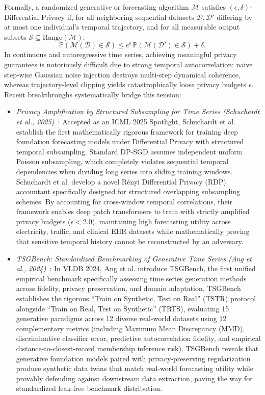 Formally, a randomized generative or forecasting algorithm $\mathcal{M}$ satisfies $(\epsilon, \delta)$-Differential Privacy if, for all neighboring sequential datasets $\mathcal{D}, \mathcal{D}'$ differing by at most one individual's temporal trajectory, and for all measurable output subsets $\mathcal{S} \subseteq \text{Range}(\mathcal{M})$:
\begin{equation}
    \mathbb{P}(\mathcal{M}(\mathcal{D}) \in \mathcal{S}) \le e^\epsilon \, \mathbb{P}(\mathcal{M}(\mathcal{D}') \in \mathcal{S}) + \delta.
\end{equation}
In continuous and autoregressive time series, achieving meaningful privacy guarantees is notoriously difficult due to strong temporal autocorrelation: naive step-wise Gaussian noise injection destroys multi-step dynamical coherence, whereas trajectory-level clipping yields catastrophically loose privacy budgets $\epsilon$. Recent breakthroughs systematically bridge this tension:
\begin{itemize}[leftmargin=*]
    \item \emph{Privacy Amplification by Structured Subsampling for Time Series (Schuchardt et al., 2025)}~\cite{schuchardt2025privacy}: Accepted as an ICML 2025 Spotlight, Schuchardt et al. establish the first mathematically rigorous framework for training deep foundation forecasting models under Differential Privacy with structured temporal subsampling. Standard DP-SGD assumes independent uniform Poisson subsampling, which completely violates sequential temporal dependencies when dividing long series into sliding training windows. Schuchardt et al. develop a novel Rényi Differential Privacy (RDP) accountant specifically designed for structured overlapping subsampling schemes. By accounting for cross-window temporal correlations, their framework enables deep patch transformers to train with strictly amplified privacy budgets ($\epsilon < 2.0$), maintaining high forecasting utility across electricity, traffic, and clinical EHR datasets while mathematically proving that sensitive temporal history cannot be reconstructed by an adversary.
    \item \emph{TSGBench: Standardized Benchmarking of Generative Time Series (Ang et al., 2024)}~\cite{ang2024tsgbench}: In VLDB 2024, Ang et al. introduce TSGBench, the first unified empirical benchmark specifically assessing time series generation methods across fidelity, privacy preservation, and domain adaptation. TSGBench establishes the rigorous ``Train on Synthetic, Test on Real'' (TSTR) protocol alongside ``Train on Real, Test on Synthetic'' (TRTS), evaluating 15 generative paradigms across 12 diverse real-world datasets using 12 complementary metrics (including Maximum Mean Discrepancy (MMD), discriminative classifier error, predictive autocorrelation fidelity, and empirical distance-to-closest-record membership inference risk). TSGBench reveals that generative foundation models paired with privacy-preserving regularization produce synthetic data twins that match real-world forecasting utility while provably defending against downstream data extraction, paving the way for standardized leak-free benchmark distribution.
\end{itemize}

